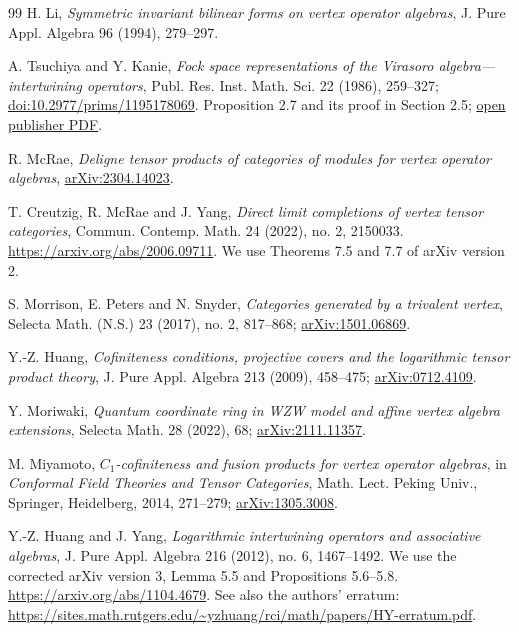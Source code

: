 \documentclass[11pt,a4paper]{article}
\numberwithin{equation}{section}
\theoremstyle{definition}\newtheorem{definition}[theorem]{Definition}
\theoremstyle{remark}\newtheorem{remark}[theorem]{Remark}
\begin{document}
\begin{thebibliography}{99}
H. Li, \emph{Symmetric invariant bilinear forms on vertex operator algebras}, J. Pure Appl. Algebra 96 (1994), 279--297.


A. Tsuchiya and Y. Kanie, \emph{Fock space representations of the Virasoro algebra---intertwining operators}, Publ. Res. Inst. Math. Sci. 22 (1986), 259--327; \href{https://doi.org/10.2977/prims/1195178069}{doi:10.2977/prims/1195178069}. Proposition 2.7 and its proof in Section 2.5; \href{https://ems.press/content/serial-article-files/42320}{open publisher PDF}.


R. McRae, \emph{Deligne tensor products of categories of modules for vertex operator algebras}, \href{https://arxiv.org/abs/2304.14023}{arXiv:2304.14023}.


T. Creutzig, R. McRae and J. Yang,
\emph{Direct limit completions of vertex tensor categories},
Commun. Contemp. Math. 24 (2022), no. 2, 2150033.
\url{https://arxiv.org/abs/2006.09711}.
We use Theorems 7.5 and 7.7 of arXiv version 2.


S. Morrison, E. Peters and N. Snyder, \emph{Categories generated by a trivalent vertex}, Selecta Math. (N.S.) 23 (2017), no. 2, 817--868; \href{https://arxiv.org/abs/1501.06869}{arXiv:1501.06869}.


Y.-Z. Huang, \emph{Cofiniteness conditions, projective covers and the logarithmic tensor product theory}, J. Pure Appl. Algebra 213 (2009), 458--475; \href{https://arxiv.org/abs/0712.4109}{arXiv:0712.4109}.


Y. Moriwaki, \emph{Quantum coordinate ring in WZW model and affine vertex algebra extensions}, Selecta Math. 28 (2022), 68; \href{https://arxiv.org/abs/2111.11357}{arXiv:2111.11357}.


M. Miyamoto, \emph{$C_1$-cofiniteness and fusion products for vertex operator algebras}, in \emph{Conformal Field Theories and Tensor Categories}, Math. Lect. Peking Univ., Springer, Heidelberg, 2014, 271--279; \href{https://arxiv.org/abs/1305.3008}{arXiv:1305.3008}.


Y.-Z. Huang and J. Yang,
\emph{Logarithmic intertwining operators and associative algebras},
J. Pure Appl. Algebra 216 (2012), no. 6, 1467--1492.
We use the corrected arXiv version 3, Lemma 5.5 and
Propositions 5.6--5.8.
\url{https://arxiv.org/abs/1104.4679}.
See also the authors' erratum:
\url{https://sites.math.rutgers.edu/~yzhuang/rci/math/papers/HY-erratum.pdf}.



\end{thebibliography}
\end{document}
